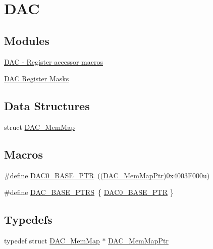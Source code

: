 \hypertarget{group___d_a_c___peripheral}{}\section{D\+AC}
\label{group___d_a_c___peripheral}
\subsection*{Modules}
\begin{DoxyCompactItemize}
\item 
\hyperlink{group___d_a_c___register___accessor___macros}{D\+A\+C -\/ Register accessor macros}
\item 
\hyperlink{group___d_a_c___register___masks}{D\+A\+C Register Masks}
\end{DoxyCompactItemize}
\subsection*{Data Structures}
\begin{DoxyCompactItemize}
\item 
struct \hyperlink{struct_d_a_c___mem_map}{D\+A\+C\+\_\+\+Mem\+Map}
\end{DoxyCompactItemize}
\subsection*{Macros}
\begin{DoxyCompactItemize}
\item 
\#define \hyperlink{group___d_a_c___peripheral_gabe3b30df06ec04e5c899efd6e49f1800}{D\+A\+C0\+\_\+\+B\+A\+S\+E\+\_\+\+P\+TR}~((\hyperlink{group___d_a_c___peripheral_gaf4fffbe25ce148c577ec740897223a7f}{D\+A\+C\+\_\+\+Mem\+Map\+Ptr})0x4003\+F000u)
\item 
\#define \hyperlink{group___d_a_c___peripheral_gab47690040e4d63adc4f324358c27157a}{D\+A\+C\+\_\+\+B\+A\+S\+E\+\_\+\+P\+T\+RS}~\{ \hyperlink{group___d_a_c___peripheral_gabe3b30df06ec04e5c899efd6e49f1800}{D\+A\+C0\+\_\+\+B\+A\+S\+E\+\_\+\+P\+TR} \}
\end{DoxyCompactItemize}
\subsection*{Typedefs}
\begin{DoxyCompactItemize}
\item 
typedef struct \hyperlink{struct_d_a_c___mem_map}{D\+A\+C\+\_\+\+Mem\+Map} $\ast$ \hyperlink{group___d_a_c___peripheral_gaf4fffbe25ce148c577ec740897223a7f}{D\+A\+C\+\_\+\+Mem\+Map\+Ptr}
\end{DoxyCompactItemize}


